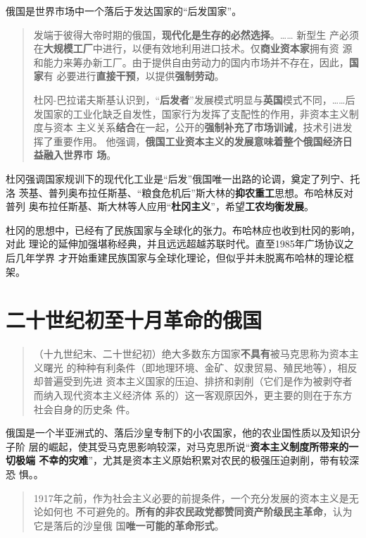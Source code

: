 俄国是世界市场中一个落后于发达国家的“后发国家”。
\begin{quotation}
  发端于彼得大帝时期的俄国，\textbf{现代化是生存的必然选择}。…… 新型生
  产必须在\textbf{大规模工厂}中进行，以便有效地利用进口技术。仅\textbf{商业资本家}拥有资
  源和能力来筹办新工厂。由于提供自由劳动力的国内市场并不存在，因此，\textbf{国家}有
  必要进行\textbf{直接干预}，以提供\textbf{强制劳动}。

  杜冈-巴拉诺夫斯基认识到，“\textbf{后发者}”发展模式明显与\textbf{英国}模式不同，……后
  发国家的工业化缺乏自发性，国家行为发挥了支配性的作用，非资本主义制度与资本
  主义关系\textbf{结合}在一起，公开的\textbf{强制补充了市场训诫}，技术引进发挥了重要作用。
  他强调，\textbf{俄国工业资本主义的发展意味着整个俄国经济日益融入世界市
    场}。
\end{quotation}

杜冈强调国家规训下的现代化工业是“后发”俄国唯一出路的论调，奠定了列宁、托洛
茨基、普列奥布拉任斯基、“粮食危机后”斯大林的\textbf{抑农重工}思想。布哈林反对普列
奥布拉任斯基、斯大林等人应用“\textbf{杜冈主义}”，希望\textbf{工农均衡发展}。

杜冈的思想中，已经有了民族国家与全球化的张力。布哈林应也收到杜冈的影响，对此
理论的延伸加强堪称经典，并且远远超越苏联时代。直至1985年广场协议之后几年学界
才开始重建民族国家与全球化理论，但似乎并未脱离布哈林的理论框架。

\section{二十世纪初至十月革命的俄国}

\begin{quotation}
  （十九世纪末、二十世纪初）绝大多数东方国家\textbf{不具有}被马克思称为资本主义曙光
  的种种有利条件（即地理环境、金矿、奴隶贸易、殖民地等），相反却普遍受到先进
  资本主义国家的压迫、排挤和剥削（它们是作为被剥夺者而纳入现代资本主义经济体
  系的）这一客观原因外，更主要的则在于东方社会自身的历史条
  件。
\end{quotation}

俄国是一个半亚洲式的、落后沙皇专制下的小农国家，他的农业国性质以及知识分子阶
层的崛起，使其受马克思影响较深，对马克思所说“\textbf{资本主义制度所带来的一切极端
  不幸的灾难}”，尤其是资本主义原始积累对农民的极强压迫剥削，带有较深恐
惧。。

\begin{quotation}
  1917年之前，作为社会主义必要的前提条件，一个充分发展的资本主义是无论如何也
  不可避免的。\textbf{所有的非农民政党都赞同资产阶级民主革命}，认为它是落后的沙皇俄
  国\textbf{唯一可能的革命形式}。
\end{quotation}

